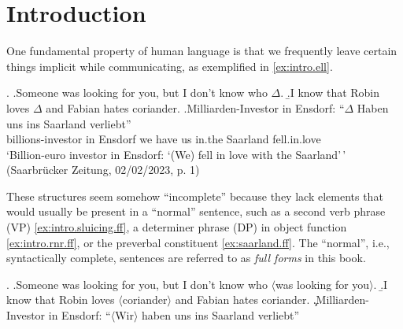 \chapter{Introduction}
\largerpage[2]
One fundamental property of human language is that we frequently leave certain things implicit while communicating, as exemplified in \ref{ex:intro.ell}.%

\ex.\label{ex:intro.ell}
\a.\label{ex:intro.sluicing}Someone was looking for you, but I don't know who $\Delta$.
\b.\label{ex:intro.rnr}I know that Robin loves $\Delta$ and Fabian hates coriander.
\cg.\label{ex:intro.td}Milliarden-Investor in Ensdorf: ``$\Delta$ Haben uns ins Saarland verliebt''\\ 
billions-investor in Ensdorf we have us in.the Saarland fell.in.love\\
`Billion-euro investor in Ensdorf: `(We) fell in love with the Saarland'\,' (Saarbrücker Zeitung, 02/02/2023, p. 1)

\noindent
These structures seem somehow ``incomplete'' because they lack elements that would usually be present in a ``normal'' sentence, such as a second verb phrase (VP)  \ref{ex:intro.sluicing.ff}, a determiner phrase (DP) in object function \ref{ex:intro.rnr.ff}, or the preverbal constituent \ref{ex:saarland.ff}.
The ``normal'', i.e., syntactically complete, sentences are referred to as \textit{full forms} in this book.

\ex.\label{ex:intro.ff}
\a.\label{ex:intro.sluicing.ff}Someone was looking for you, but I don't know who $\langle$was looking for you$\rangle$.
\b.\label{ex:intro.rnr.ff}I know that Robin loves $\langle$coriander$\rangle$ and Fabian hates coriander.
\c.\label{ex:saarland.ff}Milliarden-Investor in Ensdorf: ``$\langle$Wir$\rangle$ haben uns ins Saarland verliebt''

